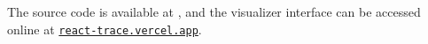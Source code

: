 
The source code is available at \href{https://github.com/Zeta611/react-trace}{}, and the visualizer interface can be accessed online at \href{https://react-trace.vercel.app/}{\nolinkurl{react-trace.vercel.app}}.
